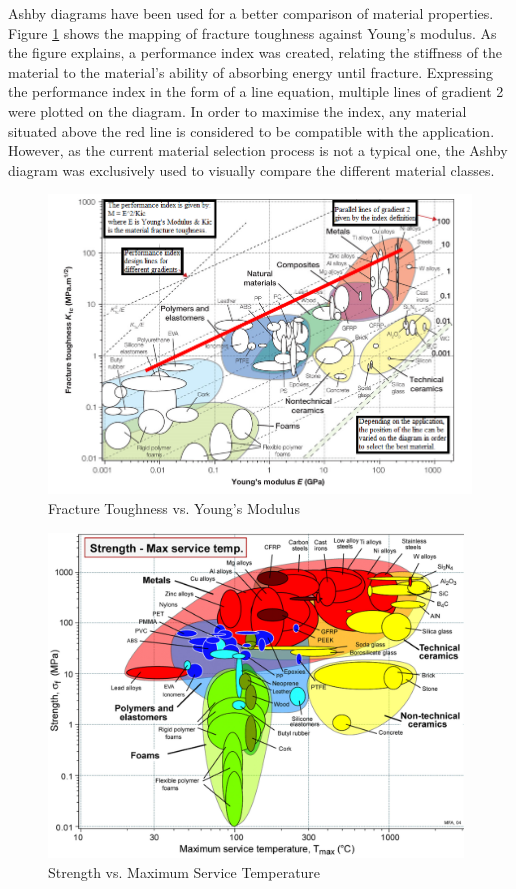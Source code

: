 \documentclass[12pt]{article}
\begin{document}
\noindent Ashby diagrams have been used for a better comparison of material properties. Figure \ref{young} shows the mapping of fracture toughness against Young’s modulus. As the figure explains, a performance index was created, relating the stiffness of the material to the material's ability of absorbing energy until fracture. Expressing the performance index in the form of a line equation, multiple lines of gradient 2 were plotted on the diagram. In order to maximise the index, any material situated above the red line is considered to be compatible with the application. However, as the current material selection process is not a typical one, the Ashby diagram was exclusively used to visually compare the different material classes. \\

\begin{figure}[hptb]
    \includegraphics[width=13cm]{KicModulusAshby}
    \caption{Fracture Toughness vs. Young's Modulus \cite{MATPROPERTIESREF}}
    \label{young}
\end{figure}

\begin{figure}[hptb]
    \includegraphics[width=11cm]{AshbyStrengthMaxTem.jpg}
    \caption{Strength vs. Maximum Service Temperature \cite{MATPROPERTIESREF}}
    \label{strength}
\end{figure}
\end{document}
